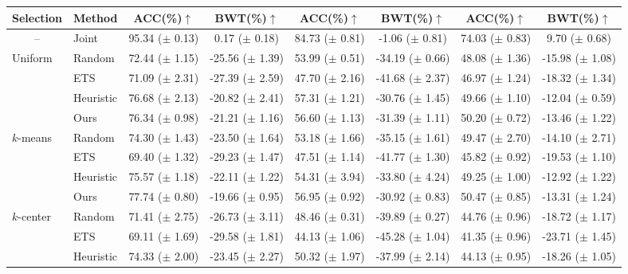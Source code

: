 \begin{table}[t]
{\begin{tabular}{l l c c c c c c}
         {\bf Selection} & {\bf Method} & ACC(\%)$\uparrow$ & BWT(\%)$\uparrow$ & ACC(\%)$\uparrow$ & BWT(\%)$\uparrow$ & ACC(\%)$\uparrow$ & BWT(\%)$\uparrow$ \\
        \midrule 
        \multicolumn{1}{c}{--} & Joint & 95.34 ($\pm$ 0.13) & 0.17 ($\pm$ 0.18) & 84.73 ($\pm$ 0.81) & -1.06 ($\pm$ 0.81) & 74.03 ($\pm$ 0.83) & 9.70 ($\pm$ 0.68) \\
		\midrule
        \multirow{4}{*}{Uniform} & Random & 72.44 ($\pm$ 1.15) & -25.56 ($\pm$ 1.39) & 53.99 ($\pm$ 0.51) & -34.19 ($\pm$ 0.66) & 48.08 ($\pm$ 1.36) & -15.98 ($\pm$ 1.08) \\
         & ETS & 71.09 ($\pm$ 2.31) & -27.39 ($\pm$ 2.59) & 47.70 ($\pm$ 2.16) & -41.68 ($\pm$ 2.37) & 46.97 ($\pm$ 1.24) & -18.32 ($\pm$ 1.34) \\
         & Heuristic & 76.68 ($\pm$ 2.13) & -20.82 ($\pm$ 2.41) & 57.31 ($\pm$ 1.21) & -30.76 ($\pm$ 1.45) & 49.66 ($\pm$ 1.10) & -12.04 ($\pm$ 0.59) \\
         & Ours & 76.34 ($\pm$ 0.98) & -21.21 ($\pm$ 1.16) & 56.60 ($\pm$ 1.13) & -31.39 ($\pm$ 1.11) & 50.20 ($\pm$ 0.72) & -13.46 ($\pm$ 1.22) \\
        \midrule 
        \multirow{4}{*}{$k$-means} & Random & 74.30 ($\pm$ 1.43) & -23.50 ($\pm$ 1.64) & 53.18 ($\pm$ 1.66) & -35.15 ($\pm$ 1.61) & 49.47 ($\pm$ 2.70) & -14.10 ($\pm$ 2.71) \\
         & ETS & 69.40 ($\pm$ 1.32) & -29.23 ($\pm$ 1.47) & 47.51 ($\pm$ 1.14) & -41.77 ($\pm$ 1.30) & 45.82 ($\pm$ 0.92) & -19.53 ($\pm$ 1.10) \\
         & Heuristic & 75.57 ($\pm$ 1.18) & -22.11 ($\pm$ 1.22) & 54.31 ($\pm$ 3.94) & -33.80 ($\pm$ 4.24) & 49.25 ($\pm$ 1.00) & -12.92 ($\pm$ 1.22) \\
         & Ours & 77.74 ($\pm$ 0.80) & -19.66 ($\pm$ 0.95) & 56.95 ($\pm$ 0.92) & -30.92 ($\pm$ 0.83) & 50.47 ($\pm$ 0.85) & -13.31 ($\pm$ 1.24) \\
        \midrule 
        \multirow{4}{*}{$k$-center} & Random & 71.41 ($\pm$ 2.75) & -26.73 ($\pm$ 3.11) & 48.46 ($\pm$ 0.31) & -39.89 ($\pm$ 0.27) & 44.76 ($\pm$ 0.96) & -18.72 ($\pm$ 1.17) \\
         & ETS & 69.11 ($\pm$ 1.69) & -29.58 ($\pm$ 1.81) & 44.13 ($\pm$ 1.06) & -45.28 ($\pm$ 1.04) & 41.35 ($\pm$ 0.96) & -23.71 ($\pm$ 1.45) \\
         & Heuristic & 74.33 ($\pm$ 2.00) & -23.45 ($\pm$ 2.27) & 50.32 ($\pm$ 1.97) & -37.99 ($\pm$ 2.14) & 44.13 ($\pm$ 0.95) & -18.26 ($\pm$ 1.05) \\

\end{tabular}}
\end{table}
